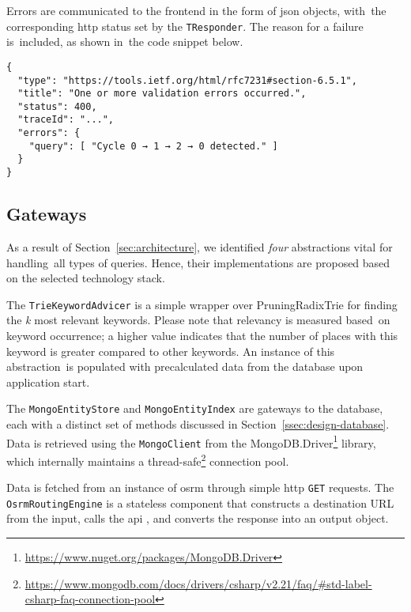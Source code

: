Errors are communicated to the frontend in the form of \acs{json} objects, with~the cor\-re\-spond\-ing \acs{http} status set by the \texttt{TResponder}. The reason for a failure is~in\-clud\-ed, as shown in~the code snippet below.

\begin{verbatim}
{
  "type": "https://tools.ietf.org/html/rfc7231#section-6.5.1",
  "title": "One or more validation errors occurred.",
  "status": 400,
  "traceId": "...",
  "errors": {
    "query": [ "Cycle 0 → 1 → 2 → 0 detected." ]
  }
}
\end{verbatim}

\subsection{Gateways}


As a result of Section~\ref{sec:architecture}, we identified \emph{four} abstractions vital for handling~all types of queries. Hence, their implementations are proposed based on the selected technology stack.

The \texttt{TrieKeywordAdvicer} is a simple wrapper over PruningRadixTrie for finding the \emph{k} most relevant keywords. Please note that relevancy is measured based~on keyword occurrence; a higher value indicates that the number of places with this keyword is greater compared to other keywords. An instance of this abstraction~is populated with precalculated data from the database upon application start.

The \texttt{MongoEntityStore} and \texttt{MongoEntityIndex} are gateways to the database, each with a distinct set of methods discussed in Section~\ref{ssec:design-database}. Data is retrieved using the \texttt{MongoClient} from the MongoDB.Driver\footnote{\href{https://www.nuget.org/packages/MongoDB.Driver}{https://www.nuget.org/packages/MongoDB.Driver}} library, which internally maintains a thread-safe\footnote{\href{https://www.mongodb.com/docs/drivers/csharp/v2.21/faq/\#std-label-csharp-faq-connection-pool}{https://www.mongodb.com/docs/drivers/csharp/v2.21/faq/\#std-label-csharp-faq-connection-pool}} connection pool.

Data is fetched from an instance of \acs{osrm} through simple \acs{http} \texttt{GET} requests. The \texttt{OsrmRoutingEngine} is a stateless component that constructs a destination URL from the input, calls the \acs{api} \cite{osrm}, and converts the response into an output object.

